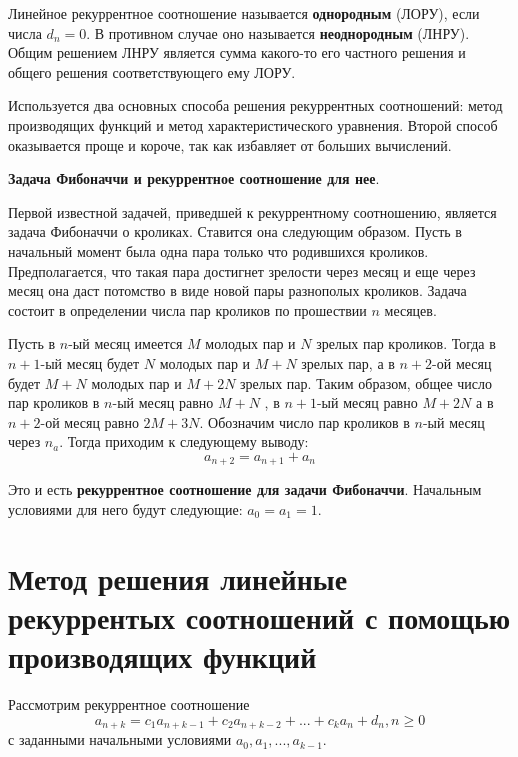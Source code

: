 \vspace{5mm}

Линейное рекуррентное соотношение называется \textbf{однородным} (ЛОРУ), если числа $d_n = 0$. В 
противном случае оно называется \textbf{неоднородным} (ЛНРУ). Общим решением ЛНРУ является сумма
какого-то его частного решения и общего решения соответствующего ему ЛОРУ.

Используется два основных способа решения рекуррентных соотношений: метод производящих функций
и метод характеристического уравнения. Второй способ оказывается проще и короче, так как избавляет от
больших вычислений.

\vspace{5mm}

\textbf{Задача Фибоначчи и рекуррентное соотношение для нее}.
 
Первой известной задачей, приведшей к рекуррентному соотношению,
является задача Фибоначчи о кроликах. Ставится она следующим
образом. Пусть в начальный момент была одна пара только что
родившихся кроликов. Предполагается, что такая пара достигнет зрелости
через месяц и еще через месяц она даст потомство в виде новой пары
разнополых кроликов. Задача состоит в определении числа пар кроликов
по прошествии $n$ месяцев.

Пусть в $n$-ый месяц имеется $M$ молодых пар и $N$ зрелых пар кроликов. 
Тогда в $n+1$-ый месяц будет $N$ молодых пар и $M + N$ зрелых пар, а в $n+2$-ой
месяц будет $M + N$ молодых пар и $M + 2N$ зрелых пар. Таким образом, общее число
пар кроликов в $n$-ый месяц равно $M + N$ , в $n+1$-ый месяц равно $M + 2N$
а в $n+2$-ой месяц равно $2M + 3N$. Обозначим число пар кроликов в $n$-ый месяц 
через $n_a$. Тогда приходим к следующему выводу:
\begin{equation}
    a_{n+2} = a_{n+1} + a_n
\end{equation}

Это и есть \textbf{рекуррентное соотношение для задачи Фибоначчи}. Начальным условиями для него
будут следующие: $a_0 = a_1 = 1$.

\section{Метод решения линейные рекуррентых соотношений с помощью производящих функций}
Рассмотрим рекуррентное соотношение
\begin{equation*}
    a_{n+k} = c_1 a_{n+k-1} + c_2 a_{n+k-2} + ... + c_k a_n + d_n, n \geq 0
\end{equation*}
с заданными начальными условиями $a_0, a_1, ..., a_{k-1}$.


